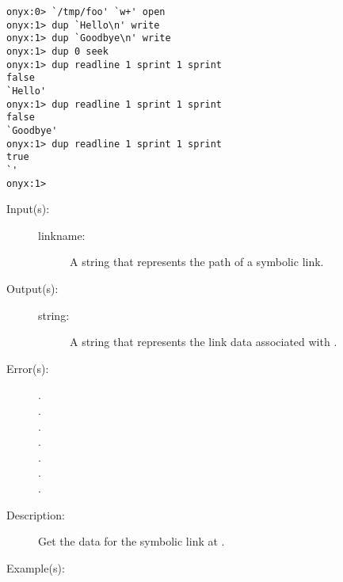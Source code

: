 \begin{description}
\begin{description}
\begin{verbatim}
onyx:0> `/tmp/foo' `w+' open
onyx:1> dup `Hello\n' write
onyx:1> dup `Goodbye\n' write
onyx:1> dup 0 seek
onyx:1> dup readline 1 sprint 1 sprint
false
`Hello'
onyx:1> dup readline 1 sprint 1 sprint
false
`Goodbye'
onyx:1> dup readline 1 sprint 1 sprint
true
`'
onyx:1>
		\end{verbatim}
	\end{description}
\label{systemdict:readlink}
\item[{\onyxop{linkname}{readlink}{string}}: ]
	\begin{description}\item[]
	\item[Input(s): ]
		\begin{description}\item[]
		\item[linkname: ]
			A string that represents the path of a symbolic link.
		\end{description}
	\item[Output(s): ]
		\begin{description}\item[]
		\item[string: ]
			A string that represents the link data associated with
			.
		\end{description}
	\item[Error(s): ]
		\begin{description}\item[]
		\item[.]
		\item[.]
		\item[.]
		\item[.]
		\item[.]
		\item[.]
		\item[.]
		\end{description}
	\item[Description: ]
		Get the data for the symbolic link at .
	\item[Example(s): ]\begin{verbatim}


\end{verbatim}
\end{description}
\end{description}
